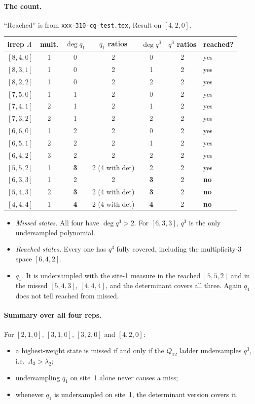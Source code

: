 \documentclass[11pt]{article}
\newcommand{\nb}[1]{\texttt{#1}}
\theoremstyle{definition}
\theoremstyle{remark}
\begin{document}
\paragraph{The count.} ``Reached'' is from \nb{xxx-310-cg-test.tex}, Result on $[4,2,0]$.
\begin{center}
\begin{tabular}{lcccccl}\toprule
irrep $\Lambda$ & mult. & $\deg q_1$ & $q_1$ ratios & $\deg q^3$ & $q^3$ ratios & reached?\\\midrule
$[8,4,0]$ & 1 & 0 & 2 & 0 & 2 & yes\\
$[8,3,1]$ & 1 & 0 & 2 & 1 & 2 & yes\\
$[8,2,2]$ & 1 & 0 & 2 & 2 & 2 & yes\\
$[7,5,0]$ & 1 & 1 & 2 & 0 & 2 & yes\\
$[7,4,1]$ & 2 & 1 & 2 & 1 & 2 & yes\\
$[7,3,2]$ & 2 & 1 & 2 & 2 & 2 & yes\\
$[6,6,0]$ & 1 & 2 & 2 & 0 & 2 & yes\\
$[6,5,1]$ & 2 & 2 & 2 & 1 & 2 & yes\\
$[6,4,2]$ & 3 & 2 & 2 & 2 & 2 & yes\\
$[5,5,2]$ & 1 & \textbf{3} & 2 (4 with det) & 2 & 2 & yes\\\midrule
$[6,3,3]$ & 1 & 2 & 2 & \textbf{3} & 2 & \textbf{no}\\
$[5,4,3]$ & 2 & \textbf{3} & 2 (4 with det) & \textbf{3} & 2 & \textbf{no}\\
$[4,4,4]$ & 1 & \textbf{4} & 2 (4 with det) & \textbf{4} & 2 & \textbf{no}\\\bottomrule
\end{tabular}
\end{center}
\begin{itemize}
\item \emph{Missed states.} All four have $\deg q^3>2$. For $[6,3,3]$, $q^3$ is the only undersampled polynomial.
\item \emph{Reached states.} Every one has $q^3$ fully covered, including the multiplicity-3 space $[6,4,2]$.
\item \emph{$q_1$.} It is undersampled with the site-1 measure in the reached $[5,5,2]$ and in the missed $[5,4,3]$, $[4,4,4]$, and the determinant covers all three. Again $q_1$ does not tell reached from missed.
\end{itemize}

\paragraph{Summary over all four reps.} For $[2,1,0]$, $[3,1,0]$, $[3,2,0]$ and $[4,2,0]$:
\begin{itemize}
\item a highest-weight state is missed if and only if the $Q_{12}$ ladder undersamples $q^3$, i.e.\ $\Lambda_3>\lambda_2$;
\item undersampling $q_1$ on site~1 alone never causes a miss;
\item whenever $q_1$ is undersampled on site~1, the determinant version covers it.
\end{itemize}
\end{document}

